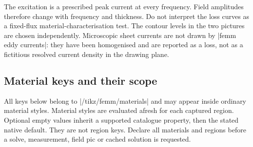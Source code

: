 
The excitation is a prescribed peak current at every frequency. Field amplitudes
therefore change with frequency and thickness. Do not interpret the loss curves
as a fixed-flux material-characterisation test. The contour levels in the two
pictures are chosen independently. Microscopic sheet currents are not drawn by
|femm eddy currents|: they have been homogenised and are reported as a loss,
not as a fictitious resolved current density in the drawing plane.

\subsection{Material keys and their scope}
All keys below belong to |/tikz/femm/materials| and may appear inside ordinary
material styles. Material styles are evaluated afresh for each captured region.
Optional empty values inherit a supported catalogue property, then the stated
native default. They are not region keys. Declare all materials and regions
before a solve, measurement, field pic or cached solution is requested.

